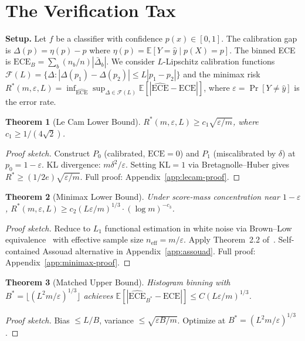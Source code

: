 \documentclass{article}
\newcommand{\ECE}{\mathrm{ECE}}
\newcommand{\cF}{\mathcal{F}}
\newcommand{\Lip}{L}
\newcommand{\errrate}{\varepsilon}
\newcommand{\nsamples}{m}
\newcommand{\calmapraw}{\eta}
\newcommand{\calmap}{\Delta}
\providecommand{\E}{}
\renewcommand{\E}{\mathbb{E}}
\providecommand{\KL}{}
\renewcommand{\KL}{\mathrm{KL}}
\newcommand{\targetacc}{\delta}
\newtheorem{theorem}{Theorem}
\theoremstyle{definition}
\begin{document}
\section{The Verification Tax}
\label{sec:theory}

\textbf{Setup.} Let $f$ be a classifier with confidence $p(x) \in [0,1]$. The calibration gap is $\calmap(p) = \calmapraw(p) - p$ where $\calmapraw(p) = \E[Y{=}\hat{y} \mid p(X){=}p]$. The binned ECE is $\ECE_B = \sum_b (n_b/n)|\bar{\calmap}_b|$. We consider $\Lip$-Lipschitz calibration functions $\cF(\Lip) = \{\calmap : |\calmap(p_1) - \calmap(p_2)| \leq \Lip|p_1-p_2|\}$ and the minimax risk $R^*(\nsamples,\errrate,\Lip) = \inf_{\widehat{\ECE}} \sup_{\calmap \in \cF(\Lip)} \E[|\widehat{\ECE} - \ECE|]$, where $\errrate = \Pr[Y \neq \hat{y}]$ is the error rate.

\begin{theorem}[Le Cam Lower Bound]
\label{thm:lecam}
$R^*(\nsamples, \errrate, \Lip) \geq c_1 \sqrt{\errrate/\nsamples}$, where $c_1 \geq 1/(4\sqrt{2})$.
\end{theorem}
\begin{proof}[Proof sketch]
Construct $P_0$ (calibrated, $\ECE = 0$) and $P_1$ (miscalibrated by $\targetacc$) at $p_0 = 1-\errrate$. KL divergence: $\nsamples\targetacc^2/\errrate$. Setting $\KL=1$ via Bretagnolle--Huber gives $R^* \geq (1/2e)\sqrt{\errrate/\nsamples}$. Full proof: Appendix~\ref{app:lecam-proof}.
\end{proof}

\begin{theorem}[Minimax Lower Bound]
\label{thm:minimax-lb}
Under score-mass concentration near $1{-}\errrate$, $R^*(\nsamples, \errrate, \Lip) \geq c_2 (\Lip \errrate/\nsamples)^{1/3} \cdot (\log \nsamples)^{-c_3}$.
\end{theorem}
\begin{proof}[Proof sketch]
Reduce to $L_1$ functional estimation in white noise via Brown--Low equivalence~\citep{brown1996equivalence} with effective sample size $n_{\mathrm{eff}} = \nsamples/\errrate$. Apply Theorem~2.2 of~\citet{lepski1999estimation}. Self-contained Assouad alternative in Appendix~\ref{app:assouad}. Full proof: Appendix~\ref{app:minimax-proof}.
\end{proof}

\begin{theorem}[Matched Upper Bound]
\label{thm:upper-bound}
Histogram binning with $B^* = \lfloor(\Lip^2\nsamples/\errrate)^{1/3}\rfloor$ achieves $\E[|\widehat{\ECE}_{B^*} - \ECE|] \leq C(\Lip\errrate/\nsamples)^{1/3}$.
\end{theorem}
\begin{proof}[Proof sketch]
Bias $\leq \Lip/B$, variance $\leq \sqrt{\errrate B/\nsamples}$. Optimize at $B^* = (\Lip^2\nsamples/\errrate)^{1/3}$.
\end{proof}
\end{document}
